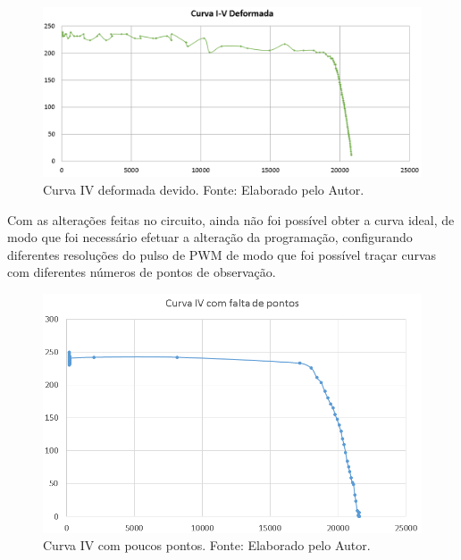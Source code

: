 \FloatBarrier
\begin{figure}[!htbp]
	\centering
	\includegraphics[scale=0.4]{imagens/CurvaIVdeformada}
	\caption{Curva IV deformada devido. Fonte: Elaborado pelo Autor. 	}
	\label{fig:CurvaDeformada}
\end{figure}
\FloatBarrier


Com as alterações feitas no circuito, ainda não foi possível obter a curva ideal, de modo que foi necessário efetuar a alteração da programação, configurando diferentes resoluções do pulso de PWM de modo que foi possível traçar curvas com diferentes números de pontos de observação.

\FloatBarrier
\begin{figure}[!htbp]
	\centering
	\includegraphics[scale=0.7]{imagens/CurvaIVpoucospontos}
	\caption{Curva IV com poucos pontos. Fonte: Elaborado pelo Autor. 	}
	\label{fig:Curvapoucos}
\end{figure}
\FloatBarrier

